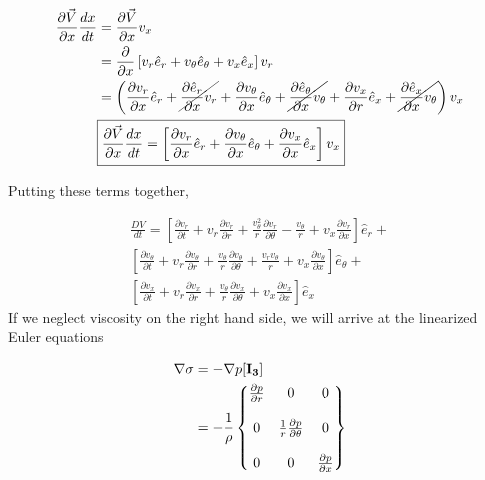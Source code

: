 \documentclass[12pt]{article}
\begin{document}
\begin{align*}
\frac{\partial \vec{V}}{ \partial x}\frac{dx}{dt}  &= \frac{\partial \vec{V}}{ \partial x}v_x\\
	&= \frac{\partial}{\partial x}
\left[
v_r 	   \hat{e}_r +
v_{\theta} \hat{e}_{\theta} +
v_x		   \hat{e}_x
\right]  v_r \\ 
&=
\left(
\frac{\partial v_r}{\partial x} 		\hat{e}_r +
\cancel{\frac{\partial  \hat{e}_r}{\partial x} 		v_r}       +
\frac{\partial v_{\theta}}{\partial x}		\hat{e}_{\theta} +
\cancel{\frac{\partial \hat{e}_{\theta}}{\partial x} v_{\theta}}  +
\frac{\partial v_x}{\partial r}\hat{e}_{x} +
\cancel{\frac{\partial \hat{e}_{x}}{\partial x} v_{\theta}} \right) v_x\\ 
&\boxed{ 
	\frac{\partial \vec{V}}{ \partial x}\frac{dx}{dt}     = \left[
	\frac{\partial 		  v_r}{\partial x} 		\hat{e}_r +
	\frac{\partial v_{\theta}}{\partial x}		\hat{e}_{\theta} +
	\frac{\partial v_x}{\partial x}\hat{e}_{x}\right] v_x} \\
\end{align*}


Putting these terms together,

\begin{align*}
\frac{DV}{dt} =
\left[ 
\frac{\partial v_r}{\partial t} + 
v_r \frac{\partial v_r}{\partial r}  +
\frac{v_{\theta}^2}{r}\frac{\partial v_r}{\partial \theta } -
\frac{v_{\theta}}{r} + v_x \frac{\partial v_r}{\partial x} 
\right] \hat{e}_r +\\
\left[ 
\frac{\partial v_\theta}{\partial t} + 
v_r \frac{\partial v_\theta}{\partial r}  +
\frac{v_{\theta}}{r}\frac{\partial v_{\theta}}{\partial \theta } +
\frac{v_r v_\theta}{r} +
 v_x \frac{\partial v_{\theta}}{\partial x} 
\right] \hat{e}_{\theta} +\\
\left[ 
\frac{\partial v_x}{\partial t} + 
v_r \frac{\partial v_x}{\partial r}  +
\frac{v_{\theta}}{r}\frac{\partial v_x}{\partial \theta } + v_x \frac{\partial v_x}{\partial x} 
\right] \hat{e}_x
\end{align*}
If we neglect viscosity on the right hand side, we will arrive at the linearized Euler equations

\begin{align*}
	\nabla \sigma &= -\nabla p [\bf{I_3}]\\
	&=-\frac{1}{\rho}\begin{Bmatrix*}
	\frac{\partial p}{\partial r} & 0 & 0\\
	\\
	0 & \frac{1}{r}\frac{\partial p}{\partial \theta} & 0\\
	\\
	0 & 0 &	\frac{\partial p}{\partial x} \\
	\end{Bmatrix*}	
\end{align*}
\end{document}
